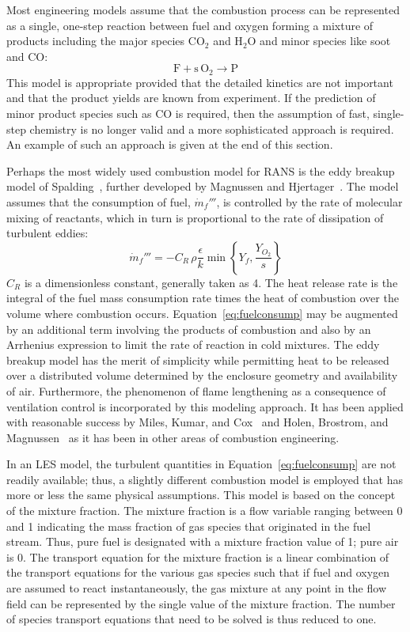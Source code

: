 \documentclass[graybox]{svmult}
\begin{document}
Most engineering models assume that the combustion process can be represented as a single, one-step reaction between fuel and oxygen forming a mixture of products including the major species CO$_2$ and H$_2$O and minor species like soot and CO:
\begin{equation}
\mathrm{F + s \, O_2 \rightarrow P}
\label{eq:simplereac}
\end{equation}
This model is appropriate provided that the detailed kinetics are not important and that the product yields are known from experiment. If the prediction of minor product species such as CO is required, then the assumption of fast, single-step chemistry is no longer valid and a more sophisticated approach is required. An example of such an approach is given at the end of this section.

Perhaps the most widely used combustion model for RANS is the eddy breakup model of Spalding~\cite{Spalding:1971}, further developed by Magnussen and Hjertager~\cite{Magnussen}. The model assumes that the consumption of fuel, $\dot{m}_f'''$, is controlled by the rate of molecular mixing of reactants, which in turn is proportional to the rate of dissipation of turbulent eddies:
\begin{equation}
\dot{m}_f''' = -C_R \, \rho \frac{\epsilon}{k} \min \left\{ Y_f, \frac{Y_{O_2}}{s} \right\}
\label{eq:fuelconsump}
\end{equation}
$C_R$ is a dimensionless constant, generally taken as 4. The heat release rate is the integral of the fuel mass consumption rate times the heat of combustion over the volume where combustion occurs. Equation~\ref{eq:fuelconsump} may be augmented by an additional term involving the products of combustion and also by an Arrhenius expression to limit the rate of reaction in cold mixtures. The eddy breakup model has the merit of simplicity while permitting heat to be released over a distributed volume determined by the enclosure geometry and availability of air. Furthermore, the phenomenon of flame lengthening as a consequence of ventilation control is incorporated by this modeling approach. It has been applied with reasonable success by Miles, Kumar, and Cox~\cite{Miles} and Holen, Brostrom, and Magnussen~\cite{Holen} as it has been in other areas of combustion engineering.

In an LES model, the turbulent quantities in Equation~\ref{eq:fuelconsump} are not readily available; thus, a slightly different combustion model is employed that has more or less the same physical assumptions. This model is based on the concept of the mixture fraction. The mixture fraction is a flow variable ranging between 0 and 1 indicating the mass fraction of gas species that originated in the fuel stream. Thus, pure fuel is designated with a mixture fraction value of 1; pure air is 0. The transport equation for the mixture fraction is a linear combination of the transport equations for the various gas species such that if fuel and oxygen are assumed to react instantaneously, the gas mixture at any point in the flow field can be represented by the single value of the mixture fraction. The number of species transport equations that need to be solved is thus reduced to one.
\end{document}
